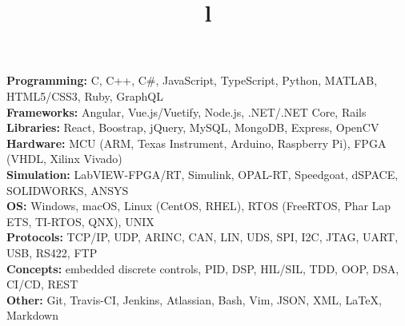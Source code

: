 \documentclass[mm]{res}
\begin{document}



\begin{resume}

\npspctoprule
\section{\headingskills}
\tb \textbf{Programming:} C, C++, C\#, JavaScript, TypeScript, Python, MATLAB, HTML5/CSS3, Ruby, GraphQL\\
\tb \textbf{Frameworks:} Angular, Vue.js/Vuetify, Node.js, .NET/.NET Core, Rails\\
\tb \textbf{Libraries:} React, Boostrap, jQuery, MySQL, MongoDB, Express, OpenCV\\
\tb \textbf{Hardware:} MCU (ARM, Texas Instrument, Arduino, Raspberry Pi), FPGA (VHDL, Xilinx Vivado)\\
\tb \textbf{Simulation:} LabVIEW-FPGA/RT, Simulink, OPAL-RT, Speedgoat, dSPACE, SOLIDWORKS, ANSYS\\
\tb \textbf{OS:} Windows, macOS, Linux (CentOS, RHEL), RTOS (FreeRTOS, Phar Lap ETS, TI-RTOS, QNX), UNIX\\
\tb \textbf{Protocols:} TCP/IP, UDP, ARINC, CAN, LIN, UDS, SPI, I2C, JTAG, UART, USB, RS422, FTP\\
\tb \textbf{Concepts:} embedded discrete controls, PID, DSP, HIL/SIL, TDD, OOP, DSA, CI/CD, REST\\
\tb \textbf{Other:} Git, Travis-CI, Jenkins, Atlassian, Bash, Vim, JSON, XML, \LaTeX, Markdown


\toprule

\section{\headingeducation}
\begin{format}
\\
\title{l}\\
\end{format}


\end{resume}
\end{document}
